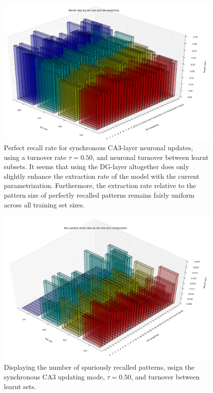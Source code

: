 \begin{figure}
    \centering
    \includegraphics[width=13cm]{fig/3d_perfect_recall_by_set_size_and_dgw_sync_tr_050_tm0}
    \caption{Perfect recall rate for synchronous CA3-layer neuronal updates, using a turnover rate $\tau=0.50$, and neuronal turnover between learnt subsets. It seems that using the DG-layer altogether does only slightly enhance the extraction rate of the model with the current parametrization. Furthermore, the extraction rate relative to the pattern size of perfectly recalled patterns remains fairly uniform across all training set sizes.}
    \label{fig:3d_perfect_recall_by_set_size_and_dgw_sync_tr_050_tm0}
\end{figure}

\begin{figure}
    \centering
    \includegraphics[width=13cm]{fig/3d_non_perfect_recall_by_set_size_and_dgw_sync_tr_050_tm0_angle_ss}
    \caption{Displaying the number of spuriously recalled patterns, usign the synchronous CA3 updating mode, $\tau=0.50$, and turnover between learnt sets.}
    \label{fig:3d_non_perfect_recall_by_set_size_and_dgw_sync_tr_050_tm0_angle_ss}
\end{figure}


